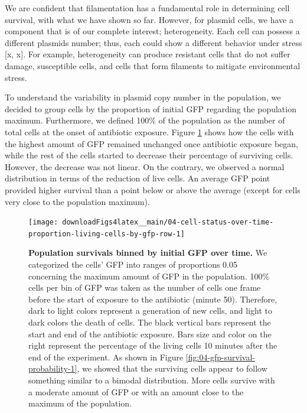 \documentclass[a4paper, nobind]{templates/ociamthesis}
\begin{document}
We are confident that filamentation has a fundamental role in determining cell survival, with what we have shown so far.
However, for plasmid cells, we have a component that is of our complete interest; heterogeneity.
Each cell can possess a different plasmids number; thus, each could show a different behavior under stress {[}x, x{]}.
For example, heterogeneity can produce resistant cells that do not suffer damage, susceptible cells, and cells that form filaments to mitigate environmental stress.

To understand the variability in plasmid copy number in the population, we decided to group cells by the proportion of initial GFP regarding the population maximum.
Furthermore, we defined 100\% of the population as the number of total cells at the onset of antibiotic exposure.
Figure \ref{fig:04-cell-status-over-time-proportion-living-cells-by-gfp-row-1} shows how the cells with the highest amount of GFP remained unchanged once antibiotic exposure began, while the rest of the cells started to decrease their percentage of surviving cells.
However, the decrease was not linear.
On the contrary, we observed a normal distribution in terms of the reduction of live cells.
An average GFP point provided higher survival than a point below or above the average (except for cells very close to the population maximum).





\begin{figure}[H]
\texttt{[image: downloadFigs4latex\_\_main/04-cell-status-over-time-proportion-living-cells-by-gfp-row-1]} \caption[Population survivals binned by initial GFP over time.]{\textbf{Population survivals binned by initial GFP over time.} We categorized the cells' GFP into ranges of proportions 0.05 concerning the maximum amount of GFP in the population. 100\% cells per bin of GFP was taken as the number of cells one frame before the start of exposure to the antibiotic (minute 50). Therefore, dark to light colors represent a generation of new cells, and light to dark colors the death of cells. The black vertical bars represent the start and end of the antibiotic exposure. Bars size and color on the right represent the percentage of the living cells 10 minutes after the end of the experiment. As shown in Figure \ref{fig:04-gfp-survival-probability-1}, we showed that the surviving cells appear to follow something similar to a bimodal distribution. More cells survive with a moderate amount of GFP or with an amount close to the maximum of the population.}\label{fig:04-cell-status-over-time-proportion-living-cells-by-gfp-row-1}
\end{figure}
\end{document}
